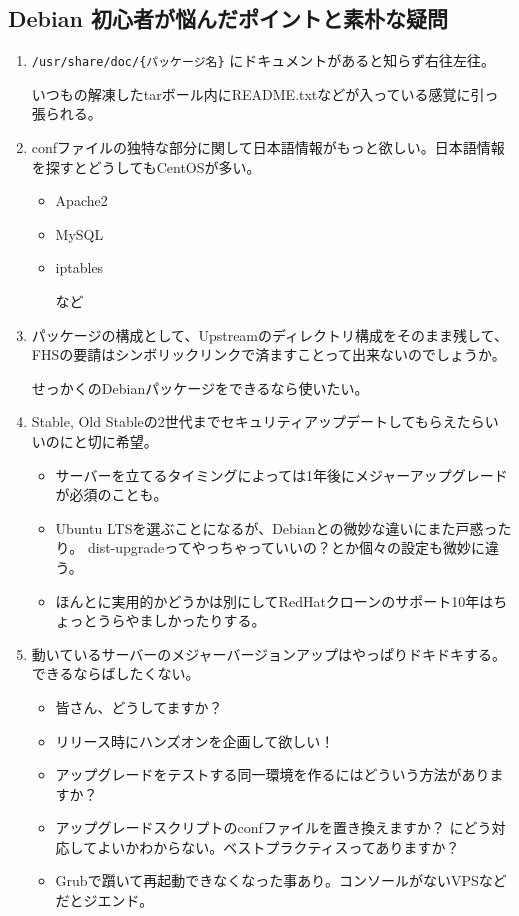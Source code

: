\documentclass[mingoth,a4paper]{jsarticle}
\begin{document}
\subsection{Debian 初心者が悩んだポイントと素朴な疑問}
\begin{enumerate}
\item {\tt /usr/share/doc/\{パッケージ名\}} にドキュメントがあると知らず右往左往。

  いつもの解凍したtarボール内にREADME.txtなどが入っている感覚に引っ張られる。

\item confファイルの独特な部分に関して日本語情報がもっと欲しい。日本語情報を探すとどうしてもCentOSが多い。
  \begin{itemize}
  \item Apache2
  \item MySQL
  \item iptables

    など
  \end{itemize}

\item パッケージの構成として、Upstreamのディレクトリ構成をそのまま残して、FHSの要請はシンボリックリンクで済ますことって出来ないのでしょうか。

せっかくのDebianパッケージをできるなら使いたい。

\item Stable, Old Stableの2世代までセキュリティアップデートしてもらえたらいいのにと切に希望。
  \begin{itemize}
  \item サーバーを立てるタイミングによっては1年後にメジャーアップグレードが必須のことも。
  \item Ubuntu LTSを選ぶことになるが、Debianとの微妙な違いにまた戸惑ったり。 dist-upgradeってやっちゃっていいの？とか個々の設定も微妙に違う。
  \item ほんとに実用的かどうかは別にしてRedHatクローンのサポート10年はちょっとうらやましかったりする。
  \end{itemize}

\item 動いているサーバーのメジャーバージョンアップはやっぱりドキドキする。できるならばしたくない。
  \begin{itemize}
  \item 皆さん、どうしてますか？
  \item リリース時にハンズオンを企画して欲しい！
  \item アップグレードをテストする同一環境を作るにはどういう方法がありますか？
  \item アップグレードスクリプトのconfファイルを置き換えますか？ にどう対応してよいかわからない。ベストプラクティスってありますか？
  \item Grubで躓いて再起動できなくなった事あり。コンソールがないVPSなどだとジエンド。
  \end{itemize}


\end{enumerate}
\end{document}
